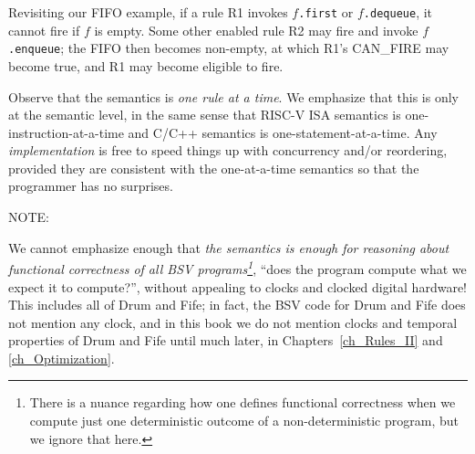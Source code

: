 Revisiting our FIFO example, if a rule R1 invokes $f$\verb|.first| or
$f$\verb|.dequeue|, it cannot fire if $f$ is empty.  Some other
enabled rule R2 may fire and invoke $f$\verb|.enqueue|; the FIFO then
becomes non-empty, at which R1's CAN\_FIRE may become true, and R1 may
become eligible to fire.

Observe that the semantics is \emph{one rule at a time}.  We emphasize
that this is only at the semantic level, in the same sense that RISC-V
ISA semantics is one-instruction-at-a-time and C/C++ semantics is
one-statement-at-a-time.  Any \emph{implementation} is free to speed
things up with concurrency and/or reordering, provided they are
consistent with the one-at-a-time semantics so that the programmer has
no surprises.

\vspace{2ex}

NOTE: 

\vspace{2ex}

We cannot emphasize enough that \emph{the semantics is enough for
reasoning about functional correctness of all BSV
programs\footnote{There is a nuance regarding how one defines
functional correctness when we compute just one deterministic outcome
of a non-deterministic program, but we ignore that here.}}, {\ie}
``does the program compute what we expect it to compute?'', without
appealing to clocks and clocked digital hardware! This includes all of
Drum and Fife; in fact, the BSV code for Drum and Fife does not
mention any clock, and in this book we do not mention clocks and
temporal properties of Drum and Fife until much later, in
Chapters~\ref{ch_Rules_II} and \ref{ch_Optimization}.

